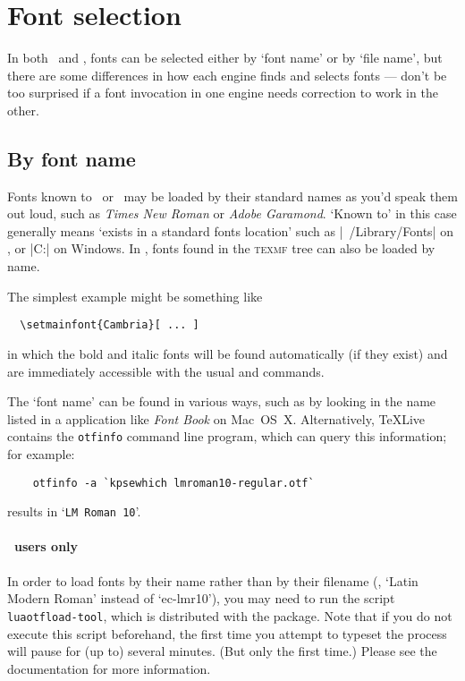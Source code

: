\section{Font selection}

In both \LuaTeX\ and \XeTeX, fonts can be selected either by `font name' or
by `file name', but there are some differences in how each engine finds and selects fonts --- don't be too surprised if a font invocation in one engine needs correction to work in the other.


\subsection{By font name}

Fonts known to \LuaTeX\ or \XeTeX\ may be loaded by their standard names as
you'd speak them out loud, such as \emph{Times New Roman} or
\emph{Adobe Garamond}.
`Known to' in this case generally means `exists in a standard fonts location'
such as |~/Library/Fonts| on \MacOSX, or |C:\Windows\Fonts| on Windows.
In \LuaTeX, fonts found in the \textsc{texmf} tree can also be loaded by name.

The simplest example might be something like
\begin{Verbatim}
  \setmainfont{Cambria}[ ... ]
\end{Verbatim}
in which the bold and italic fonts will be found automatically
(if they exist) and are immediately accessible with the usual
 and  commands.

The `font name' can be found in various ways, such as by looking in the name listed in a application like \emph{Font Book} on Mac~OS~X.
Alternatively, \TeX{}Live contains the \texttt{otfinfo} command line program, which can query this information; for example:
\begin{Verbatim}
    otfinfo -a `kpsewhich lmroman10-regular.otf`
\end{Verbatim}
results in `\texttt{LM Roman 10}'.

\paragraph{\LuaTeX\ users only}
In order to load fonts by their name rather than by their filename (\eg,
`Latin Modern Roman' instead of `ec-lmr10'), you may need to run the script
\texttt{luaotfload-tool}, which is distributed with the 
package. Note that if you do not execute this script beforehand, the first
time you attempt to typeset the process will pause for (up to) several
minutes. (But only the first time.)
Please see the  documentation for more information.


